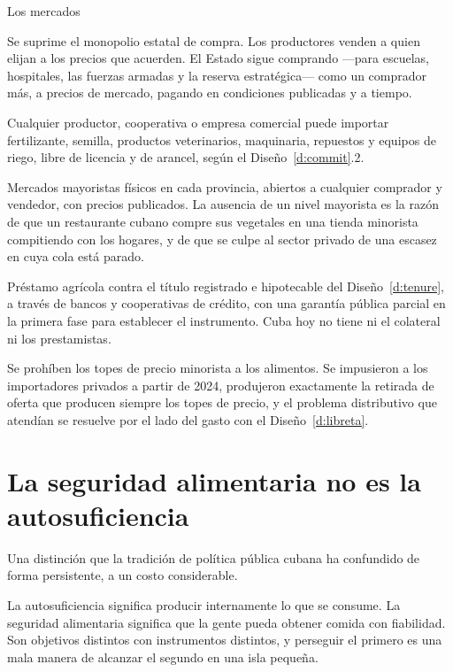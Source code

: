 \begin{design}{Los mercados}
\label{d:acopio}
\begin{rules}
 Se suprime el monopolio estatal de compra. Los productores venden a
quien elijan a los precios que acuerden. El Estado sigue comprando ---para escuelas,
hospitales, las fuerzas armadas y la reserva estratégica--- como un comprador más, a precios de
mercado, pagando en condiciones publicadas y a tiempo.

 Cualquier productor, cooperativa o empresa comercial
puede importar fertilizante, semilla, productos veterinarios, maquinaria, repuestos y equipos
de riego, libre de licencia y de arancel, según el Diseño~\ref{d:commit}.2.

 Mercados mayoristas físicos en cada provincia, abiertos a cualquier
comprador y vendedor, con precios publicados. La ausencia de un nivel mayorista es la razón de
que un restaurante cubano compre sus vegetales en una tienda minorista compitiendo con los
hogares, y de que se culpe al sector privado de una escasez en cuya cola está parado.

 Préstamo agrícola contra el título registrado e hipotecable del
Diseño~\ref{d:tenure}, a través de bancos y cooperativas de crédito, con una garantía pública
parcial en la primera fase para establecer el instrumento. Cuba hoy no tiene ni el colateral ni
los prestamistas.

 Se prohíben los topes de precio minorista a los alimentos. Se
impusieron a los importadores privados a partir de 2024, produjeron exactamente la retirada de
oferta que producen siempre los topes de precio, y el problema distributivo que atendían se
resuelve por el lado del gasto con el Diseño~\ref{d:libreta}.
\end{rules}
\end{design}

\section{La seguridad alimentaria no es la autosuficiencia}

Una distinción que la tradición de política pública cubana ha confundido de forma persistente,
a un costo considerable.

La autosuficiencia significa producir internamente lo que se consume. La seguridad alimentaria
significa que la gente pueda obtener comida con fiabilidad. Son objetivos distintos con
instrumentos distintos, y perseguir el primero es una mala manera de alcanzar el segundo en una
isla pequeña.

